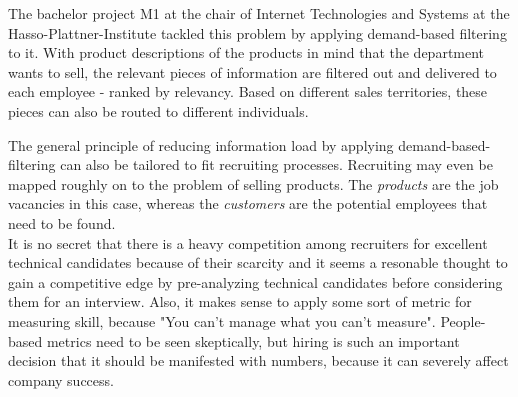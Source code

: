 The bachelor project M1 at the chair of Internet Technologies and Systems
at the Hasso-Plattner-Institute tackled this problem by applying demand-based filtering to it.
With product descriptions of the products in mind that the department wants to sell,
the relevant pieces of information are filtered out and delivered to each employee -
ranked by relevancy. Based on different sales territories,
these pieces can also be routed to different individuals.
\newline


The general principle of reducing information load by applying
demand-based-filtering can also be tailored to fit recruiting processes.
Recruiting may even be mapped roughly on to the problem of selling products.
The \textit{products} are the job vacancies in this case, whereas the
\textit{customers} are the potential employees that need to be found.\\
It is no secret that there is a heavy competition among recruiters for excellent
technical candidates because of their scarcity and it seems a resonable thought
to gain a competitive edge by pre-analyzing technical candidates
before considering them for an interview. Also, it makes sense to apply
some sort of metric for measuring skill, because
"You can't manage what you can't measure"\cite{tdm:1986}.  People-based metrics
need to be seen skeptically, but hiring is such an important decision that it
should be manifested with numbers, because it can severely affect
company success\cite{hk:1998}.
\newline



